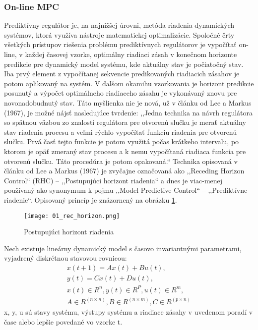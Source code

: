 \subsubsection{On-line MPC}
Prediktívny regulátor je, na najnižšej úrovni, metóda riadenia dynamických systémov, ktorá využíva nástroje matematickej optimalizácie. Spoločné črty všetkých prístupov riešenia problému prediktívnych regulátorov je vypočítať on-line, v každej časovej vzorke,  optimálny riadiaci zásah v konečnom horizonte predikcie pre dynamický model systému, kde aktuálny stav je počiatočný stav. Iba prvý element z vypočítanej sekvencie predikovaných riadiacich zásahov je potom aplikovaný na systém. V ďalšom okamihu vzorkovania je horizont predikcie posunutý a výpočet optimálneho riadiaceho zásahu je vykonávaný znovu pre novonadobudnutý stav. Táto myšlienka nie je nová, už v článku od Lee a Markus (1967), je možné nájsť nasledujúce tvrdenie: ,,Jedna technika na návrh regulátora so spätnou väzbou zo znalosti regulátora pre otvorenú slučku je merať aktuálny stav riadenia procesu a veľmi rýchlo vypočítať funkciu riadenia pre otvorenú slučku. Prvá časť tejto funkcie je potom využitá počas krátkeho intervalu, po ktorom je opäť zmeraný stav procesu a k nemu vypočítaná riadiaca funkcia pre otvorenú slučku. Táto procedúra je potom opakovaná.`` Technika opisovaná v článku od Lee a Markus (1967) je zvyčajne označovaná ako ,,Receding Horizon Control`` (RHC) – ,,Postupujúci horizont riadenia`` a dnes je viac-menej používaný ako synonymum k pojmu ,,Model Predictive Control`` – ,,Prediktívne riadenie``. \cite{MPC03} Opisovaný princíp je znázornený na obrázku \ref{01_rec_horizon}.
\begin{figure}[h]
\centering
\texttt{[image: 01\_rec\_horizon.png]}
\caption{Postupujúci horizont riadenia}
\label{01_rec_horizon}
\end{figure}
Nech existuje lineárny dynamický model s časovo invariantnými parametrami, vyjadrený diskrétnou stavovou rovnicou:
\begin{equation} \label{eq1}
\begin{split}
x(t+1)=Ax(t)+Bu(t), \\
y(t)=Cx(t)+Du(t), \\
x(t)∈R^n, y(t)∈R^P, u(t)∈R^m, \\
A∈R^{(n×n)}, B∈R^{(n×m)}, C∈R^{(p×n)}
\end{split}
\end{equation}
x, y, u sú stavy systému, výstupy systému a riadiace zásahy v uvedenom poradí v čase alebo lepšie povedané vo vzorke t. \\
